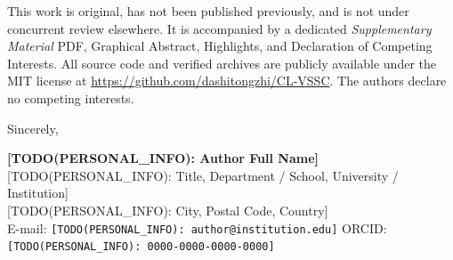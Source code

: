 \documentclass[11pt,letterpaper]{article}
\begin{document}
This work is original, has not been published previously, and is not under concurrent review elsewhere. It is accompanied by a dedicated \textit{Supplementary Material} PDF, Graphical Abstract, Highlights, and Declaration of Competing Interests. All source code and verified archives are publicly available under the MIT license at \url{https://github.com/dashitongzhi/CL-VSSC}. The authors declare no competing interests.

\vspace{6pt}
Sincerely,

\textbf{[TODO(PERSONAL\_INFO): Author Full Name]}\\
{[TODO(PERSONAL\_INFO): Title, Department / School, University / Institution]}\\
{[TODO(PERSONAL\_INFO): City, Postal Code, Country]}\\
E-mail: \texttt{[TODO(PERSONAL\_INFO): author@institution.edu]} \quad ORCID: \texttt{[TODO(PERSONAL\_INFO): 0000-0000-0000-0000]}
\end{document}
